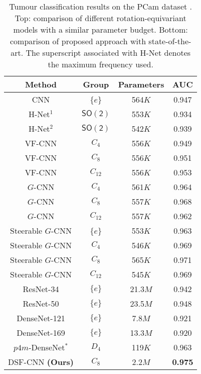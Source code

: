 \documentclass[journal]{IEEEtran}
\newcommand\SOrth{\mathsf{SO(2)}}
\begin{document}
	    		   \begin{table}[h]
	\begin{center}
		\caption{Tumour classification results on the PCam dataset \cite{veeling2018rotation}. Top: comparison of different rotation-equivariant models with a similar parameter budget. Bottom: comparison of proposed approach with state-of-the-art. The superscript associated with H-Net denotes the maximum frequency used.}
		\label{dup1 table:comparative_pcam}
		\setlength{\tabcolsep}{3pt} \renewcommand{\arraystretch}{1.0} \begin{tabular}{c|c|c|c}
			 \textbf{Method} & \textbf{Group}  & \textbf{Parameters}  &  \textbf{AUC}  \\
			\midrule
            CNN & \{$e$\} & 564$K$  & 0.947 \\
            H-Net$^1$ \cite{worrall2017harmonic} & $\SOrth$ & 553$K$  & 0.934 \\
            H-Net$^2$ \cite{worrall2017harmonic} & $\SOrth$ & 542$K$  & 0.939 \\
            VF-CNN \cite{marcos2017rotation} & $C_{4}$ & 556$K$ & 0.949   \\
            VF-CNN \cite{marcos2017rotation} & $C_{8}$ & 556$K$ & 0.951  \\
            VF-CNN \cite{marcos2017rotation} & $C_{12}$ & 556$K$ & 0.953   \\
            $G$-CNN \cite{cohen2016group} & $C_{4}$ & 561$K$  & 0.964   \\
            $G$-CNN \cite{bekkers2018roto,lafarge2020roto} & $C_{8}$ & 557$K$  & 0.968   \\
            $G$-CNN \cite{bekkers2018roto,lafarge2020roto} & $C_{12}$ & 557$K$  & 0.962   \\
            Steerable $G$-CNN \cite{weiler2018learning} & \{$e$\} & 553$K$  & 0.963   \\
            Steerable $G$-CNN \cite{weiler2018learning} & $C_{4}$ & 546$K$ & 0.969   \\
            Steerable $G$-CNN \cite{weiler2018learning} & $C_{8}$ & 565$K$ & 0.971   \\
            Steerable $G$-CNN \cite{weiler2018learning} & $C_{12}$ & 545$K$ & 0.969  \\
            \midrule
            ResNet-34 \cite{he2016deep}  & $\{e\}$ & 21.3$M$ &  0.942  \\
            ResNet-50 \cite{he2016deep}  & $\{e\}$ & 23.5$M$ & 0.948  \\
            DenseNet-121 \cite{densenet} & $\{e\}$ & 7.8$M$ & 0.921  \\
            DenseNet-169 \cite{densenet} & $\{e\}$ & 13.3$M$ & 0.920  \\
             $p4m$-DenseNet$^*$ \cite{veeling2018rotation}  & $D_{4}$ & 119$K$ & 0.963   \\
            DSF-CNN \textbf{(Ours)} & $C_{8}$ & 2.2$M$ & \textbf{0.975}  \\
			\bottomrule
		\end{tabular}
	\end{center}
	\end{table}	
\end{document}
